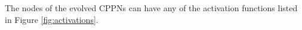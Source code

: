 The nodes of the evolved CPPNs can have any of the activation functions listed in Figure \ref{fig:activations}.








